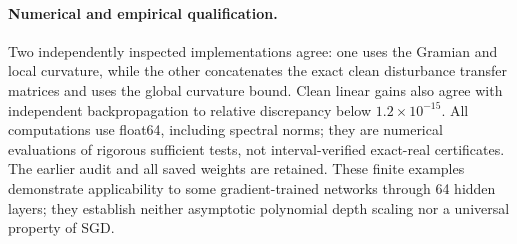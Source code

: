 \paragraph{Numerical and empirical qualification.}
Two independently inspected implementations agree: one uses the Gramian and
local curvature, while the other concatenates the exact clean disturbance
transfer matrices and uses the global curvature bound. Clean linear gains
also agree with independent backpropagation to relative discrepancy below
$1.2\times10^{-15}$. All computations use float64, including spectral norms;
they are numerical evaluations of rigorous sufficient tests, not
interval-verified exact-real certificates. The earlier audit and all saved
weights are retained. These finite examples demonstrate applicability to
some gradient-trained networks through 64 hidden layers; they establish
neither asymptotic polynomial depth scaling nor a universal property of SGD.
